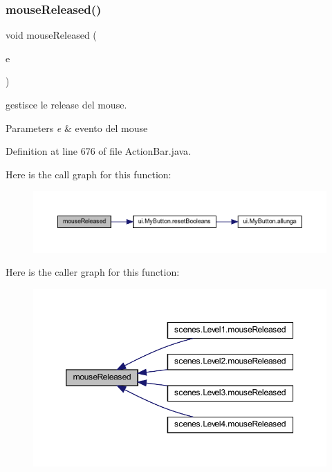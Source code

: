 \subsubsection{\texorpdfstring{mouse\+Released()}{mouseReleased()}}
{\footnotesize\ttfamily void mouse\+Released (\begin{DoxyParamCaption}\item[{Mouse\+Event}]{e }\end{DoxyParamCaption})}



gestisce le release del mouse. 


\begin{DoxyParams}{Parameters}
{\em e} & evento del mouse \\
\hline
\end{DoxyParams}


Definition at line 676 of file Action\+Bar.\+java.

Here is the call graph for this function\+:\nopagebreak
\begin{figure}[H]
\begin{center}
\leavevmode
\includegraphics[width=350pt]{classui_1_1_action_bar_a87a07291794e15052db67f945d90853e_cgraph}
\end{center}
\end{figure}
Here is the caller graph for this function\+:\nopagebreak
\begin{figure}[H]
\begin{center}
\leavevmode
\includegraphics[width=350pt]{classui_1_1_action_bar_a87a07291794e15052db67f945d90853e_icgraph}
\end{center}
\end{figure}
\mbox{\label{classui_1_1_action_bar_a99a8282ac7383f267261ca608cafe139}} 
